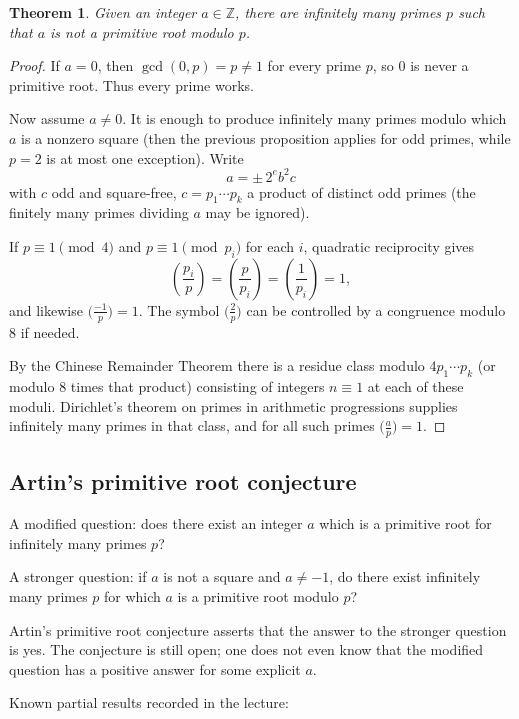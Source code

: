 \documentclass[11pt]{article}
\newtheorem{theorem}{Theorem}[section]
\theoremstyle{remark}
\DeclareMathOperator{\gcdop}{gcd}
\newcommand{\Z}{\mathbb Z}
\begin{document}
\begin{theorem}
Given an integer $a\in\Z$, there are infinitely many primes $p$ such that
$a$ is not a primitive root modulo $p$.
\end{theorem}

\begin{proof}
If $a=0$, then $\gcdop(0,p)=p\neq1$ for every prime $p$, so $0$ is never a
primitive root. Thus every prime works.

Now assume $a\neq 0$. It is enough to produce infinitely many primes modulo
which $a$ is a nonzero square (then the previous proposition applies for
odd primes, while $p=2$ is at most one exception). Write
\[
    a=\pm\,2^e b^2 c
\]
with $c$ odd and square-free, $c=p_1\cdots p_k$ a product of distinct odd
primes (the finitely many primes dividing $a$ may be ignored).

If $p\equiv 1\pmod 4$ and $p\equiv 1\pmod{p_i}$ for each $i$, quadratic
reciprocity gives
\[
    \left(\frac{p_i}{p}\right)
    =
    \left(\frac{p}{p_i}\right)
    =
    \left(\frac{1}{p_i}\right)
    =1,
\]
and likewise $\bigl(\frac{-1}{p}\bigr)=1$. The symbol $\bigl(\frac{2}{p}\bigr)$
can be controlled by a congruence modulo $8$ if needed.

By the Chinese Remainder Theorem there is a residue class modulo
$4p_1\cdots p_k$ (or modulo $8$ times that product) consisting of integers
$n\equiv 1$ at each of these moduli. Dirichlet's theorem on primes in
arithmetic progressions supplies infinitely many primes in that class, and
for all such primes $\bigl(\frac ap\bigr)=1$.
\end{proof}

\subsection{Artin's primitive root conjecture}

A modified question: does there exist an integer $a$ which is a primitive
root for infinitely many primes $p$?

A stronger question: if $a$ is not a square and $a\neq -1$, do there exist
infinitely many primes $p$ for which $a$ is a primitive root modulo $p$?

Artin's primitive root conjecture asserts that the answer to the stronger
question is yes. The conjecture is still open; one does not even know that
the modified question has a positive answer for some explicit $a$.

Known partial results recorded in the lecture:
\end{document}
